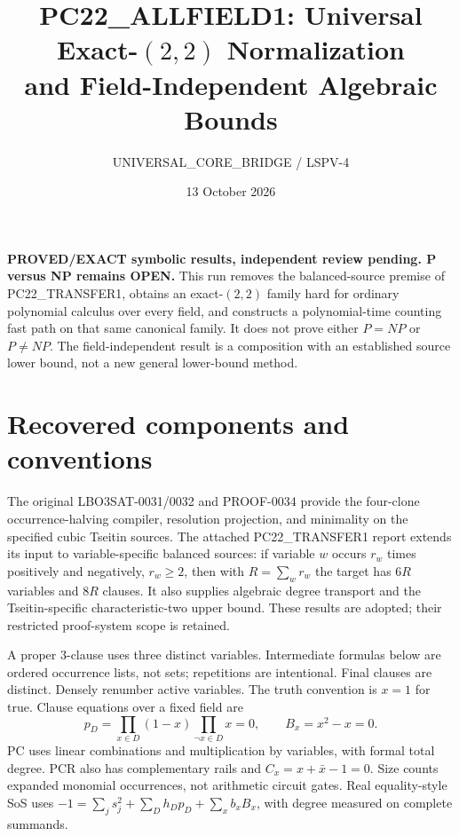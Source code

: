 \documentclass[11pt]{article}
\title{PC22\_ALLFIELD1: Universal Exact-$(2,2)$ Normalization\\and Field-Independent Algebraic Bounds}
\author{UNIVERSAL\_CORE\_BRIDGE / LSPV-4}
\date{13 October 2026}
\begin{document}
\maketitle
\noindent\textbf{PROVED/EXACT symbolic results, independent review pending. P versus NP remains OPEN.}
This run removes the balanced-source premise of PC22\_TRANSFER1, obtains an exact-$(2,2)$ family hard for ordinary polynomial calculus over every field, and constructs a polynomial-time counting fast path on that same canonical family. It does not prove either $P=NP$ or $P\ne NP$. The field-independent result is a composition with an established source lower bound, not a new general lower-bound method.

\section{Recovered components and conventions}
The original LBO3SAT-0031/0032 and PROOF-0034 provide the four-clone occurrence-halving compiler, resolution projection, and minimality on the specified cubic Tseitin sources. The attached PC22\_TRANSFER1 report extends its input to variable-specific balanced sources: if variable $w$ occurs $r_w$ times positively and negatively, $r_w\ge2$, then with $R=\sum_w r_w$ the target has $6R$ variables and $8R$ clauses. It also supplies algebraic degree transport and the Tseitin-specific characteristic-two upper bound. These results are adopted; their restricted proof-system scope is retained.

A proper 3-clause uses three distinct variables. Intermediate formulas below are ordered occurrence lists, not sets; repetitions are intentional. Final clauses are distinct. Densely renumber active variables. The truth convention is $x=1$ for true. Clause equations over a fixed field are
\[
 p_D=\prod_{x\in D}(1-x)\prod_{\neg x\in D}x=0,
 \qquad B_x=x^2-x=0.
\]
PC uses linear combinations and multiplication by variables, with formal total degree. PCR also has complementary rails and $C_x=x+\bar x-1=0$. Size counts expanded monomial occurrences, not arithmetic circuit gates. Real equality-style SoS uses
$-1=\sum_j s_j^2+\sum_D h_Dp_D+\sum_x b_xB_x$, with degree measured on complete summands.
\end{document}
